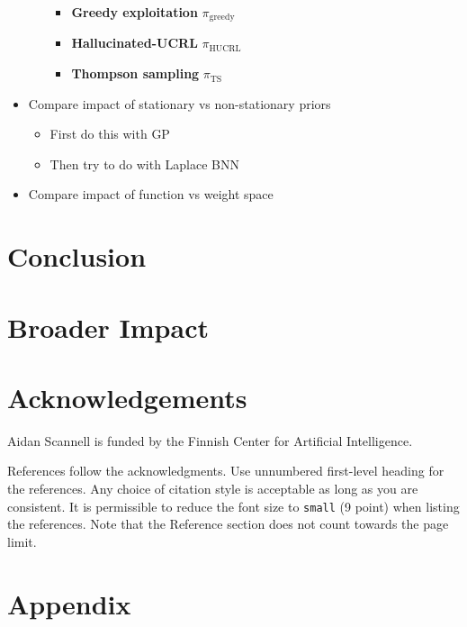 \documentclass{article}
\begin{document}
\begin{itemize}
\begin{itemize}
\begin{itemize}
      \item \textbf{Greedy exploitation} \(\pi_{\text{greedy}}\)
      \item \textbf{Hallucinated-UCRL} \(\pi_{\text{HUCRL}}\)
      \item \textbf{Thompson sampling} \(\pi_{\text{TS}}\)
    \end{itemize}
  \end{itemize}
  \item Compare impact of stationary vs non-stationary priors
  \begin{itemize}
    \item First do this with GP
    \item Then try to do with Laplace BNN
  \end{itemize}
  \item Compare impact of function vs weight space
\end{itemize}

\section{Conclusion} \label{sec:conclusion}


\section*{Broader Impact}

\section*{Acknowledgements}
Aidan Scannell is funded by the Finnish Center for Artificial Intelligence.

\small
\printbibliography
\normalsize

References follow the acknowledgments. Use unnumbered first-level heading for
the references. Any choice of citation style is acceptable as long as you are
consistent. It is permissible to reduce the font size to \verb+small+ (9 point)
when listing the references.
Note that the Reference section does not count towards the page limit.
\medskip



\appendix

\section{Appendix}
\end{document}
